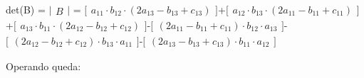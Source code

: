 \documentclass[11pt]{article}
\begin{document}
    det(B) = \(\bigl|\begin{matrix}B\end{matrix}\bigr|\) =
\(\bigl[\begin{matrix}a_{11} \cdot b_{12} \cdot (2a_{13}-b_{13}+c_{13})\end{matrix}\bigr]\)+\(\bigl[\begin{matrix}a_{12} \cdot b_{13} \cdot (2a_{11}-b_{11}+c_{11})\end{matrix}\bigr]\)+\(\bigl[\begin{matrix}a_{13} \cdot b_{11} \cdot (2a_{12}-b_{12}+c_{12})\end{matrix}\bigr]\)-\(\bigl[\begin{matrix}(2a_{11}-b_{11}+c_{11}) \cdot b_{12} \cdot a_{13}\end{matrix}\bigr]\)-\(\bigl[\begin{matrix}(2a_{12}-b_{12}+c_{12}) \cdot b_{13} \cdot a_{11}\end{matrix}\bigr]\)-\(\bigl[\begin{matrix}(2a_{13}-b_{13}+c_{13}) \cdot b_{11} \cdot a_{12}\end{matrix}\bigr]\)

    Operando queda:
\end{document}
